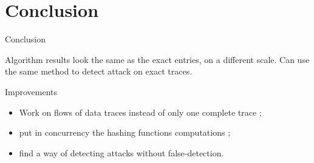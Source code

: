 \documentclass[mathserif]{beamer}
\begin{document}
\section*{Conclusion}

	\begin{frame}{Conclusion}
		\begin{block}{}
			Algorithm results look the same as the exact entries, on a different scale. Can use the same method to detect attack on exact traces.
		\end{block}
		
		\begin{block}{Improvements}
			\begin{itemize}
				\item Work on flows of data traces instead of only one complete trace ;
				\item put in concurrency the hashing functions computations	;
				\item find a way of detecting attacks without false-detection.
			\end{itemize}
		\end{block}
	\end{frame}
	
\end{document}
